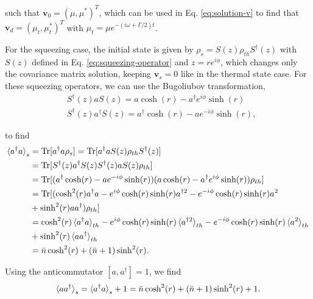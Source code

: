 \begin{apendicesenv}
\noindent such that $\mathbf{v}_{0} = (\mu, \mu^*)^T$, which can be used in Eq. \eqref{eq:solution-v} to find that $\mathbf{v}_{d} = (\mu_t, \mu_t^*)^T$ with $\mu_t = \mu e^{-(i\omega + \Gamma / 2)t}$.

For the squeezing case, the initial state is given by  $\rho_s = S (z) \rho_{th} S^\dagger (z)$ with $S (z)$ defined in Eq. \eqref{eq:squeezing-operator} and $z = r e^{i\phi}$, which changes only the covariance matrix solution, keeping $\mathbf{v}_s = 0$ like in the thermal state case. For these squeezing operators, we can use the Bugoliubov transformation,
\begin{align}
	&S^\dagger (z) a S (z) = a \cosh(r) - a^\dagger e^{i\phi} \sinh(r)\\
	&S^\dagger (z) a^\dagger S (z) = a^\dagger \cosh(r) - a e^{-i\phi} \sinh(r),
\end{align}

\noindent to find
\begin{equation}
	\begin{split}
		\braket{a^\dagger a}_s &= \text{Tr} [a^\dagger a \rho_{s}] = \text{Tr} [a^\dagger a S (z) \rho_{th} S^\dagger (z)]\\
		&= \text{Tr} [S^\dagger (z) a^\dagger S (z) S^\dagger (z) a S (z) \rho_{th}]\\
		&= \text{Tr} [ (a^\dagger \cosh(r) - a e^{-i\phi} \sinh(r)) (a \cosh(r) - a^\dagger e^{i\phi} \sinh(r)) \rho_{th}]\\
		&= \text{Tr} [ (\cosh^2 (r) a^\dagger a - e^{i\phi}\cosh(r) \sinh(r) a^{\dagger 2} - e^{-i\phi}\cosh(r) \sinh(r) a^{2}\\
		&+ \sinh^2(r) a a^\dagger) \rho_{th}]\\
		&= \cosh^2 (r) \braket{a^\dagger a}_{th} - e^{i\phi}\cosh(r) \sinh(r) \braket{a^{\dagger 2}}_{th} - e^{-i\phi}\cosh(r) \sinh(r) \braket{a^{2}}_{th}\\
		&+ \sinh^2(r) \braket{a a^\dagger}_{th}\\
		&= \bar{n} \cosh^2 (r) + (\bar{n} + 1) \sinh^2 (r).
	\end{split}
\end{equation}

\noindent Using the anticommutator $[a, a^\dagger] = 1$, we find
\begin{equation}
	\braket{a a^\dagger}_s = \braket{a^\dagger a}_s + 1 = \bar{n} \cosh^2 (r) + (\bar{n} + 1) \sinh^2 (r) + 1.
\end{equation}


\end{apendicesenv}

